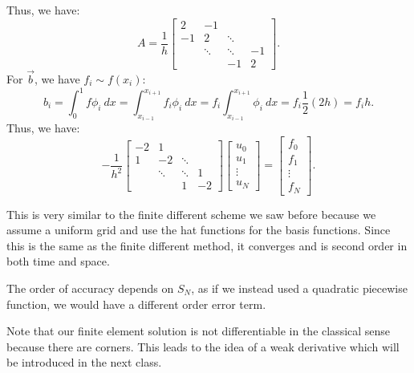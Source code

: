 \documentclass[../main/main.tex]{subfiles}
\begin{document}
   Thus, we have: \[
A = \frac{1}{h} \begin{bmatrix} 2 &-1 & & \\ -1 & 2 &\ddots & \\ &\ddots &\ddots & -1 \\ & & -1 & 2 \end{bmatrix}
   .\] For $\vec{b}$, we have $f_i \sim f(x_i)$:  \[
   b_i = \int^1_0 f \phi_i ~dx = \int_{x_{i-1}}^{x_{i+1}}f_i \phi_i ~dx = f_i \int_{x_{i-1}}^{x_{i+1}} \phi_i ~dx = f_i \frac{1}{2}(2h) = f_i h
   .\] Thus, we have: \[
-\frac{1}{h^2}\begin{bmatrix} -2 &1 & & \\ 1 & -2 &\ddots & \\ &\ddots &\ddots & 1 \\ & & 1 & -2 \end{bmatrix} \begin{bmatrix} u_0 \\ u_1 \\ \vdots \\ u_N \end{bmatrix}  = \begin{bmatrix} f_0 \\ f_1 \\ \vdots \\ f_N \end{bmatrix} 
   .\] 
   \begin{remark}
       This is very similar to the finite different scheme we saw before because we assume a uniform grid and use the hat functions for the basis functions. Since this is the same as the finite different method, it converges and is second order in both time and space.
   \end{remark}

   \begin{remark}
       The order of accuracy depends on $S_N$, as if we instead used a quadratic piecewise function, we would have a different order error term.
   \end{remark}
   Note that our finite element solution is not differentiable in the classical sense because there are corners. This leads to the idea of a weak derivative which will be introduced in the next class.
\end{document}

